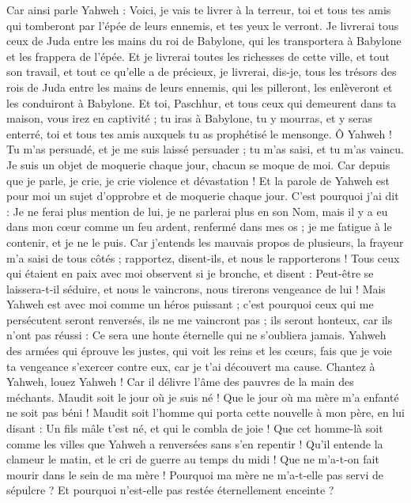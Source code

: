 \begin{multicols}{2}
Car ainsi parle Yahweh : Voici, je vais te livrer à la terreur, toi et tous tes amis qui tomberont par l'épée de leurs ennemis, et tes yeux le verront. Je livrerai tous ceux de Juda entre les mains du roi de Babylone, qui les transportera à Babylone et les frappera de l'épée.
Et je livrerai toutes les richesses de cette ville, et tout son travail, et tout ce qu'elle a de précieux, je livrerai, dis-je, tous les trésors des rois de Juda entre les mains de leurs ennemis, qui les pilleront, les enlèveront et les conduiront à Babylone.
Et toi, Paschhur, et tous ceux qui demeurent dans ta maison, vous irez en captivité ; tu iras à Babylone, tu y mourras, et y seras enterré, toi et tous tes amis auxquels tu as prophétisé le mensonge.
Ô Yahweh ! Tu m'as persuadé, et je me suis laissé persuader ; tu m'as saisi, et tu m'as vaincu. Je suis un objet de moquerie chaque jour, chacun se moque de moi.
Car depuis que je parle, je crie, je crie violence et dévastation ! Et la parole de Yahweh est pour moi un sujet d'opprobre et de moquerie chaque jour.
C'est pourquoi j'ai dit : Je ne ferai plus mention de lui, je ne parlerai plus en son Nom, mais il y a eu dans mon cœur comme un feu ardent, renfermé dans mes os ; je me fatigue à le contenir, et je ne le puis.
Car j'entends les mauvais propos de plusieurs, la frayeur m'a saisi de tous côtés ; rapportez, disent-ils, et nous le rapporterons ! Tous ceux qui étaient en paix avec moi observent si je bronche, et disent : Peut-être se laissera-t-il séduire, et nous le vaincrons, nous tirerons vengeance de lui !
Mais Yahweh est avec moi comme un héros puissant ; c'est pourquoi ceux qui me persécutent seront renversés, ils ne me vaincront pas ; ils seront honteux, car ils n'ont pas réussi : Ce sera une honte éternelle qui ne s'oubliera jamais.
Yahweh des armées qui éprouve les justes, qui voit les reins et les cœurs, fais que je voie ta vengeance s'exercer contre eux, car je t'ai découvert ma cause.
Chantez à Yahweh, louez Yahweh ! Car il délivre l'âme des pauvres de la main des méchants.
Maudit soit le jour où je suis né ! Que le jour où ma mère m'a enfanté ne soit pas béni !
Maudit soit l'homme qui porta cette nouvelle à mon père, en lui disant : Un fils mâle t'est né, et qui le combla de joie !
Que cet homme-là soit comme les villes que Yahweh a renversées sans s'en repentir ! Qu'il entende la clameur le matin, et le cri de guerre au temps du midi !
Que ne m'a-t-on fait mourir dans le sein de ma mère ! Pourquoi ma mère ne m'a-t-elle pas servi de sépulcre ? Et pourquoi n'est-elle pas restée éternellement enceinte ?

\end{multicols}
